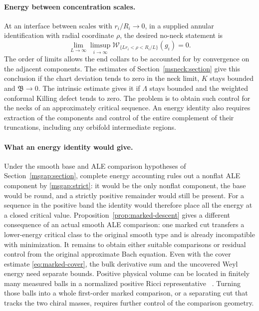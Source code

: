 \documentclass[11pt]{article}
\numberwithin{equation}{section}
\theoremstyle{definition}
\theoremstyle{remark}
\begin{document}
\paragraph{Energy between concentration scales.}
At an interface between scales with \(r_i/R_i\to0\), in a supplied
annular identification with radial coordinate \(\rho\), the desired
no-neck statement is
\begin{equation}\label{msneck:no-neck-target}
 \lim_{L\to\infty}\limsup_{i\to\infty}
 \mathcal W_{\{Lr_i<\rho<R_i/L\}}(g_i)=0 .
\end{equation}
The order of limits allows the end collars to be accounted for by
convergence on the adjacent components. The estimates of
Section~\ref{msneck:section} give this conclusion if the chart deviation
tends to zero in the neck limit, \(K\) stays bounded and
\(\mathfrak B\to0\). The intrinsic estimate gives it if \(\Lambda\)
stays bounded and the weighted conformal Killing defect tends to zero.
The problem is to obtain such control for the necks of an approximately
critical sequence. An energy identity also requires extraction of the
components and control of the entire complement of their truncations,
including any orbifold intermediate regions.

\paragraph{What an energy identity would give.}
Under the smooth base and ALE comparison hypotheses of
Section~\ref{msgap:section}, complete energy accounting rules out a
nonflat ALE component by \eqref{msgap:strict}: it would be the only
nonflat component, the base would be round, and a strictly positive
remainder would still be present. For a sequence in the positive
band the identity would therefore place all the energy at a closed
critical value. Proposition~\ref{prop:marked-descent} gives a
different consequence of an actual smooth ALE comparison: one
marked cut transfers a lower-energy critical class to the original
smooth type and is already incompatible with minimization. It
remains to obtain either suitable comparisons or residual control
from the original approximate Bach equation. Even with the cover
estimate \eqref{eq:marked-cover}, the bulk derivative sum and the
uncovered Weyl energy need separate bounds. Positive physical
volume can be located in finitely many measured balls in a
normalized positive Ricci representative
~\cite{Baker2026MarkedLimits}. Turning those balls into a whole
first-order marked comparison, or a separating cut that tracks
the two chiral masses, requires further control of the comparison
geometry.
\end{document}
